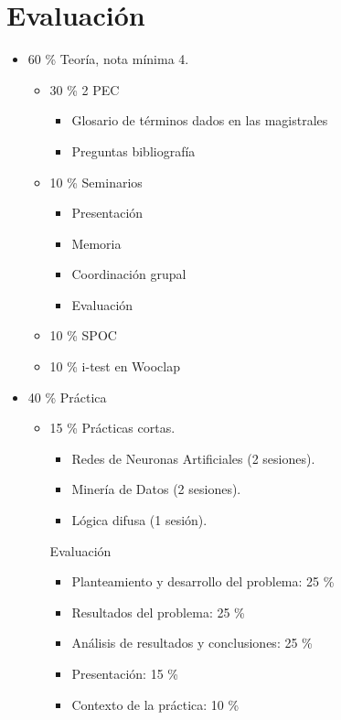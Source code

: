 \documentclass[12pt, twoside, openright]{report} %
\begin{document}
\section{Evaluación}
\begin{itemize}
	\item 60 \% Teoría, nota mínima 4.
	      \begin{itemize}
		      \item 30 \% 2 PEC
		            \begin{itemize}
			            \item Glosario de términos dados en las magistrales
			            \item Preguntas bibliografía
		            \end{itemize}
		      \item 10 \% Seminarios
		            \begin{itemize}
			            \item Presentación
			            \item Memoria
			            \item Coordinación grupal
			            \item Evaluación
		            \end{itemize}
		      \item 10 \% SPOC
		      \item 10 \% i-test en Wooclap
	      \end{itemize}
	\item 40 \% Práctica
	      \begin{itemize}
		      \item 15 \% Prácticas cortas.
		            \begin{itemize}
			            \item Redes de Neuronas Artificiales (2 sesiones).
			            \item Minería de Datos (2 sesiones).
			            \item Lógica difusa (1 sesión).
		            \end{itemize}
		            Evaluación
		            \begin{itemize}
			            \item Planteamiento y desarrollo del problema: 25 \%
			            \item Resultados del problema: 25 \%
			            \item Análisis de resultados y conclusiones: 25 \%
			            \item Presentación: 15 \%
			            \item Contexto de la práctica: 10 \%

\end{itemize}
\end{itemize}
\end{itemize}
\end{document}
